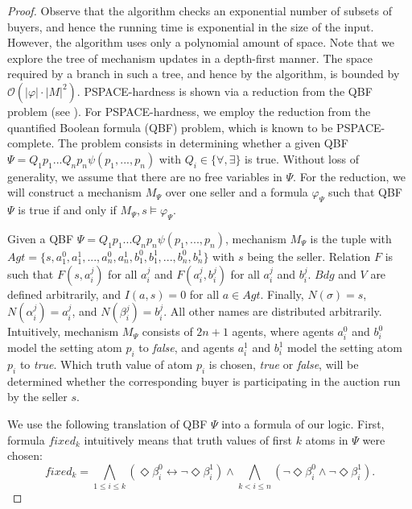 \documentclass[letterpaper]{article} %
\theoremstyle{definition}
\begin{document}
\begin{proof}
Observe that the algorithm checks an exponential number of subsets of buyers, and hence the running time is exponential in the size of the input. However, the algorithm uses only a polynomial amount of space. %
Note that we explore the tree of mechanism updates in a depth-first manner.  %
The space required by a branch in such a tree, and hence by the algorithm, is bounded by $\mathcal{O}(|\varphi|\cdot |M|^2)$. PSPACE-hardness is shown via a reduction from the QBF problem (see \cite{diffusionlogic}).
\iffalse
    For PSPACE-hardness, we employ the reduction from the quantified Boolean formula (QBF) problem, which is known to be PSPACE-complete. The problem consists in determining whether a given QBF $\Psi = Q_1 p_1 ... Q_n p_n \psi(p_1,...,p_n)$ with $Q_i \in \{\forall, \exists\}$ is true. Without loss of generality, we assume that there are no free variables in $\Psi$. For the reduction, we will construct a mechanism $M_\Psi$ over one seller and a formula $\varphi_\Psi$ such that QBF $\Psi$ is true if and only if $M_\Psi, s \models \varphi_\Psi$. 

    Given a QBF $\Psi = Q_1 p_1 ... Q_n p_n \psi(p_1,...,p_n)$, mechanism $M_\Psi$ is the tuple with $Agt = \{s, a_1^0,a_1^1, ..., a_n^0, a_n^1, b_1^0, b_1^1, ..., b_n^0, b_n^1\}$ with $s$ being the seller. Relation $F$ is such that $F(s, a_i^j)$ for all $a_i^j$ and $F(a_i^j,b_i^j)$ for all $a_i^j$ and $b_i^j$. $Bdg$ and $V$ are defined arbitrarily, and $I(a,s) = 0$ for all $a \in Agt$. Finally, $N(\sigma) = s$, $N(\alpha_i^j) = a^j_i$,  and $N(\beta_i^j) = b^j_i$. All other names are distributed arbitrarily. Intuitively, mechanism $M_\Psi$ consists of $2n+1$ agents, where agents $a^0_i$ and $b^0_i$ model the setting atom $p_i$ to \textit{false}, and agents $a^1_i$ and $b^1_i$ model the setting atom $p_i$ to \textit{true}. Which truth value of atom $p_i$ is chosen, \textit{true} or \textit{false}, will be determined whether the corresponding buyer is participating in the auction run by the seller $s$.

    We use the following translation of QBF $\Psi$ into a formula of our logic. First, formula $fixed_k$ intuitively means that truth values of first $k$ atoms in $\Psi$ were chosen:
    $$fixed_k = \bigwedge_{1 \leqslant i \leqslant k} (\Diamond \beta_i^0 \leftrightarrow \lnot \Diamond \beta_i^1) \land \bigwedge_{k < i \leqslant n} (\lnot \Diamond \beta^0_i \land \lnot \Diamond \beta^1_i).$$


\end{proof}
\end{document}
